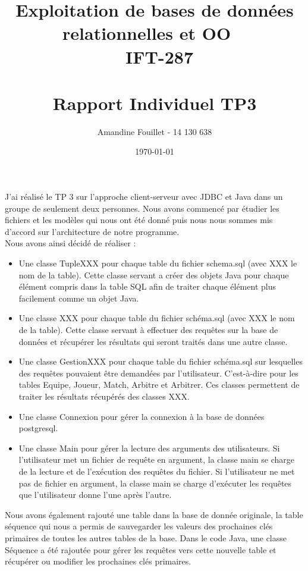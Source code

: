 \documentclass[11pt]{article}
\title{Exploitation de bases de données relationnelles et OO ~\\~\textbf{IFT-287} \\~\\ Rapport Individuel TP3}
\author{Amandine Fouillet - 14 130 638}
\date{\today}
\begin{document}
\maketitle

J'ai réalisé le TP 3 sur l'approche client-serveur avec JDBC et Java dans un groupe de seulement deux personnes. 
Nous avons commencé par étudier les fichiers et les modèles qui nous ont été donné puis nous nous sommes mis d'accord sur l'architecture de notre programme. ~\\
Nous avons ainsi décidé de réaliser : 
\begin{itemize}
\item Une classe TupleXXX pour chaque table du fichier schema.sql (avec XXX le nom de la table). Cette classe servant a créer des objets Java pour chaque élément compris dans la table SQL afin de traiter chaque élément plus facilement comme un objet Java. 
\item Une classe XXX pour chaque table du fichier schéma.sql (avec XXX le nom de la table). Cette classe servant à effectuer des requêtes sur la base de données et récupérer les résultats qui seront traités dans une autre classe.
\item Une classe GestionXXX pour chaque table du fichier schéma.sql sur lesquelles des requêtes pouvaient être demandées par l'utilisateur. C'est-à-dire pour les tables Equipe, Joueur, Match, Arbitre et Arbitrer. Ces classes permettent de traiter les résultats récupérés des classes XXX.
\item Une classe Connexion pour gérer la connexion à la base de données postgresql.
\item Une classe Main pour gérer la lecture des arguments des utilisateurs. Si l'utilisateur met un fichier de requête en argument, la classe main se charge de la lecture et de l'exécution des requêtes du fichier. Si l'utilisateur ne met pas de fichier en argument, la classe main se charge d'exécuter les requêtes que l'utilisateur donne l'une après l'autre.
\end{itemize}
Nous avons également rajouté une table dans la base de donnée originale, la table séquence qui nous a permis de sauvegarder les valeurs des prochaines clés primaires de toutes les autres tables de la base. Dans le code Java, une classe Séquence a été rajoutée pour gérer les requêtes vers cette nouvelle table et récupérer ou modifier les prochaines clés primaires.~\\
\end{document}
